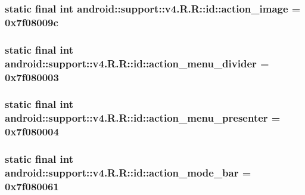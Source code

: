 \hypertarget{classandroid_1_1support_1_1v4_1_1_r_1_1id_97c577266604aa2fd82ced11f039e160}{
\subsubsection[{action\_\-image}]{\setlength{\rightskip}{0pt plus 5cm}static final int android::support::v4.R.R::id::action\_\-image = 0x7f08009c}}
\label{classandroid_1_1support_1_1v4_1_1_r_1_1id_97c577266604aa2fd82ced11f039e160}


\hypertarget{classandroid_1_1support_1_1v4_1_1_r_1_1id_360731debcc399da50b8bb6f33e18cec}{
\subsubsection[{action\_\-menu\_\-divider}]{\setlength{\rightskip}{0pt plus 5cm}static final int android::support::v4.R.R::id::action\_\-menu\_\-divider = 0x7f080003}}
\label{classandroid_1_1support_1_1v4_1_1_r_1_1id_360731debcc399da50b8bb6f33e18cec}


\hypertarget{classandroid_1_1support_1_1v4_1_1_r_1_1id_d404311470ea55f116f54c30f1f35c06}{
\subsubsection[{action\_\-menu\_\-presenter}]{\setlength{\rightskip}{0pt plus 5cm}static final int android::support::v4.R.R::id::action\_\-menu\_\-presenter = 0x7f080004}}
\label{classandroid_1_1support_1_1v4_1_1_r_1_1id_d404311470ea55f116f54c30f1f35c06}


\hypertarget{classandroid_1_1support_1_1v4_1_1_r_1_1id_e15c6230ec6f69f77d9e7c101c7cc091}{
\subsubsection[{action\_\-mode\_\-bar}]{\setlength{\rightskip}{0pt plus 5cm}static final int android::support::v4.R.R::id::action\_\-mode\_\-bar = 0x7f080061}}
\label{classandroid_1_1support_1_1v4_1_1_r_1_1id_e15c6230ec6f69f77d9e7c101c7cc091}


